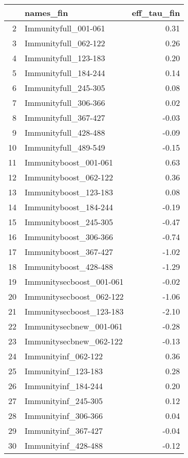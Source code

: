 \begin{table}[ht]
\centering
\begin{tabular}{rlr}
  \hline
 & names\_fin & eff\_tau\_fin \\ 
  \hline
2 & Immunityfull\_001-061 & 0.31 \\ 
  3 & Immunityfull\_062-122 & 0.26 \\ 
  4 & Immunityfull\_123-183 & 0.20 \\ 
  5 & Immunityfull\_184-244 & 0.14 \\ 
  6 & Immunityfull\_245-305 & 0.08 \\ 
  7 & Immunityfull\_306-366 & 0.02 \\ 
  8 & Immunityfull\_367-427 & -0.03 \\ 
  9 & Immunityfull\_428-488 & -0.09 \\ 
  10 & Immunityfull\_489-549 & -0.15 \\ 
  11 & Immunityboost\_001-061 & 0.63 \\ 
  12 & Immunityboost\_062-122 & 0.36 \\ 
  13 & Immunityboost\_123-183 & 0.08 \\ 
  14 & Immunityboost\_184-244 & -0.19 \\ 
  15 & Immunityboost\_245-305 & -0.47 \\ 
  16 & Immunityboost\_306-366 & -0.74 \\ 
  17 & Immunityboost\_367-427 & -1.02 \\ 
  18 & Immunityboost\_428-488 & -1.29 \\ 
  19 & Immunitysecboost\_001-061 & -0.02 \\ 
  20 & Immunitysecboost\_062-122 & -1.06 \\ 
  21 & Immunitysecboost\_123-183 & -2.10 \\ 
  22 & Immunitysecbnew\_001-061 & -0.28 \\ 
  23 & Immunitysecbnew\_062-122 & -0.13 \\ 
  24 & Immunityinf\_062-122 & 0.36 \\ 
  25 & Immunityinf\_123-183 & 0.28 \\ 
  26 & Immunityinf\_184-244 & 0.20 \\ 
  27 & Immunityinf\_245-305 & 0.12 \\ 
  28 & Immunityinf\_306-366 & 0.04 \\ 
  29 & Immunityinf\_367-427 & -0.04 \\ 
  30 & Immunityinf\_428-488 & -0.12 \\ 

\end{tabular}
\end{table}
